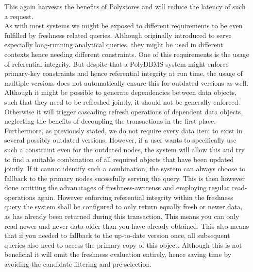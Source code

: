 This again harvests the benefits of Polystores and will reduce the latency of such a request.\\
As with most systems we might be exposed to different requirements to be even fulfilled by freshness related queries. 
Although originally introduced to serve especially long-running analytical queries, they might be used in different contexts hence needing different constraints.
One of this requirements is the usage of referential integrity.
But despite that a PolyDBMS system might enforce primary-key constraints and hence referential integrity at run time, the usage of multiple versions does not automatically
ensure this for outdated versions as well. Although it might be possible to generate dependencies between data objects, such that they need to be refreshed jointly,
it should not be generally enforced. Otherwise it will trigger cascading refresh operations of dependent data objects, neglecting the benefits of decoupling the transactions 
in the first place. Furthermore, as previously stated, we do not require every data item to exist in several possibly outdated versions.  
However, if a user wants to specifically use such a constraint even for the outdated nodes, the system will allow this and try to find a suitable combination of all required 
objects that have been updated jointly. If it cannot identify such a combination, the system can always choose to fallback to the primary nodes sucessfully serving the query.
This is then however done omitting the advanatages of freshness-awarenss and employing regular read-operations again.
However enforcing referential integrity within the freshness query the system shall be configured to only return equally fresh or newer data, 
as has already been returned during this transaction. This means you can only read newer and never data older than you have already obtained.
This also means that if you needed to fallback to the up-to-date version once, all subsequent queries also need to access the primary copy of this object. 
Although this is not beneficial it will omit the freshness evaluation entirely, hence saving time by avoiding the candidate filtering and pre-selection.

